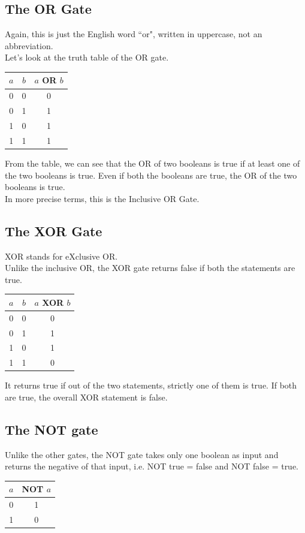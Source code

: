 \documentclass[letterpaper, 12pt]{book}
\begin{document}
\subsection{The OR Gate}
Again, this is just the English word ``or", written in uppercase, not an abbreviation.\\
Let's look at the truth table of the OR gate.\\
\begin{center}
	\begin{tabular}{ |c|c|c| } 
		\hline
		$a$ & $b$ & $a$ OR $b$ \\ 
		\hline
		0 & 0 & 0 \\ 
		0 & 1 & 1 \\
		1 & 0 & 1 \\
		1 & 1 & 1 \\
		\hline
	\end{tabular}
\end{center}
From the table, we can see that the OR of two booleans is true if at least one of the two booleans is true. Even if both the booleans are true, the OR of the two booleans is true.\\
In more precise terms, this is the Inclusive OR Gate.
\subsection{The XOR Gate}
XOR stands for eXclusive OR.\\
Unlike the inclusive OR, the XOR gate returns false if both the statements are true.\\
\begin{center}
	\begin{tabular}{ |c|c|c| } 
		\hline
		$a$ & $b$ & $a$ XOR $b$ \\ 
		\hline
		0 & 0 & 0 \\ 
		0 & 1 & 1 \\
		1 & 0 & 1 \\
		1 & 1 & 0 \\
		\hline
	\end{tabular}
\end{center}
It returns true if out of the two statements, strictly one of them is true. If both are true, the overall XOR statement is false.
\subsection{The NOT gate}
Unlike the other gates, the NOT gate takes only one boolean as input and returns the negative of that input, i.e. NOT true = false and NOT false = true.
\begin{center}
	\begin{tabular}{ |c|c| } 
		\hline
		$a$ & NOT $a$ \\ 
		\hline 
		0 & 1 \\
		1 & 0 \\
		\hline
	\end{tabular}
\end{center}
\end{document}
